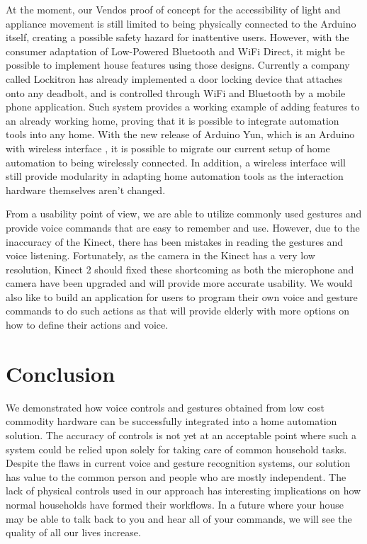 \documentclass{chi-ext}
\begin{document}
At the moment, our Vendos proof of concept for the accessibility of light and appliance movement is still limited to being physically connected to the Arduino itself, creating a possible safety hazard for inattentive users.
However, with the consumer adaptation of Low-Powered Bluetooth and WiFi Direct, it might be possible to implement house features using those designs.
Currently a company called Lockitron has already implemented a door locking device that attaches onto any deadbolt, and is controlled through WiFi and Bluetooth by a mobile phone application\cite{_lockitron}.
Such system provides a working example of adding features to an already working home, proving that it is possible to integrate automation tools into any home.
With the new release of Arduino Yun, which is an Arduino with wireless interface \cite{_arduino_yun}, it is possible to migrate our current setup of home automation to being wirelessly connected.
In addition, a wireless interface will still provide modularity in adapting home automation tools as the interaction hardware themselves aren't changed. 

From a usability point of view, we are able to utilize commonly used gestures and provide voice commands that are easy to remember and use.
However, due to the inaccuracy of the Kinect, there has been mistakes in reading the gestures and voice listening.
Fortunately, as the camera in the Kinect has a very low resolution, Kinect 2 should fixed these shortcoming as both the microphone and camera have been upgraded and will provide more accurate usability.
We would also like to build an application for users to program their own voice and gesture commands to do such actions as that will provide elderly with more options on how to define their actions and voice.

\section{Conclusion}

We demonstrated how voice controls and gestures obtained from low cost commodity hardware can be successfully integrated into a home automation solution.
The accuracy of controls is not yet at an acceptable point where such a system could be relied upon solely for taking care of common household tasks.
Despite the flaws in current voice and gesture recognition systems, our solution has value to the common person and people who are mostly independent.
The lack of physical controls used in our approach has interesting implications on how normal households have formed their workflows.
In a future where your house may be able to talk back to you and hear all of your commands, we will see the quality of all our lives increase.
\end{document}
